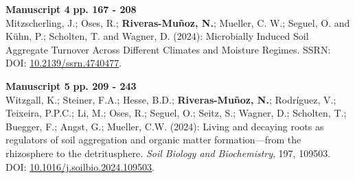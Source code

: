 \vspace{\baselineskip}

\noindent
\textbf{Manuscript 4} \hfill \textbf{pp. 167 - 208} \\ %
Mitzscherling, J.; Oses, R.; \textbf{Riveras-Muñoz, N.}; Mueller, C. W.; Seguel, O. and Kühn, P.; Scholten, T. and Wagner, D. (2024): Microbially Induced Soil Aggregate Turnover Across Different Climates and Moisture Regimes. SSRN: DOI: \href{https://doi.org/10.2139/ssrn.4740477}{10.2139/ssrn.4740477}.

\vspace{\baselineskip}

\noindent
\textbf{Manuscript 5} \hfill \textbf{pp. 209 - 243} \\ %
Witzgall, K.; Steiner, F.A.; Hesse, B.D.; \textbf{Riveras-Muñoz, N.}; Rodríguez, V.; Teixeira, P.P.C.; Li, M.; Oses, R.; Seguel, O.; Seitz, S.; Wagner, D.; Scholten, T.; Buegger, F.; Angst, G.; Mueller, C.W. (2024): Living and decaying roots as regulators of soil aggregation and organic matter formation---from the rhizosphere to the detritusphere. \textit{Soil Biology and Biochemistry}, 197, 109503. DOI: \href{https://doi.org/10.1016/j.soilbio.2024.109503}{10.1016/j.soilbio.2024.109503}.


\cleardoublepage %

